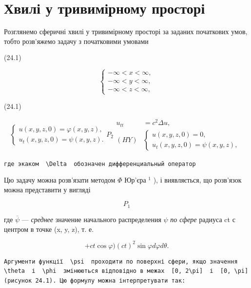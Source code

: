 \documentclass[
  ukrainian,
]{article}
\begin{document}
\section{Хвилі у тривимірному
просторі}\label{ux445ux432ux438ux43bux456-ux443-ux442ux440ux438ux432ux438ux43cux456ux440ux43dux43eux43cux443-ux43fux440ux43eux441ux442ux43eux440ux456}

Розглянемо сферичні хвилі у тривимірному просторі за заданих початкових
умов, тобто розв'яжемо задачу з початковими умовами

(24.1)

\[
\begin{cases} -\infty < x < \infty, \\ -\infty < y < \infty, \\ -\infty < z < \infty, \end{cases}
\]

(24.1)

\[
\begin{cases} u(x, y, z, 0) = \varphi(x, y, z), \\ u_{t}(x, y, z, 0) = \psi(x, y, z). \end{cases}
P_{2}
\begin{aligned} u_{tt} &= c^2 \Delta u, \\ (HY) & \begin{cases} u(x, y, z, 0) = 0, \\ u_t(x, y, z, 0) = \psi(x, y, z), \end{cases} \end{aligned}
\]

\begin{verbatim}
где экаком  \Delta  обозначен дифференциальный оператор
\end{verbatim}

Цю задачу можна розв'язати методом \(\Phi\) Юр'єра \(^{1}\) ), і
виявляється, що розв'язок можна представити у вигляді

\[
P_{1}
\]

где \(\overline{\psi}\) --- \emph{среднее} значение начального
распределения \(\psi\) \emph{по сфере} радиуса ct с центром в точке (x,
y, z), т. е.

\[
+ ct \cos \varphi  )  (ct)^2 \sin \varphi d\varphi d\theta  .
\]

\begin{verbatim}
Аргументи функції  \psi  проходити по поверхні сфери, якщо значення  \theta  і  \phi  змінюються відповідно в межах  [0, 2\pi]  і  [0, \pi]  (рисунок 24.1). Цю формулу можна інтерпретувати так:
\end{verbatim}
\end{document}
